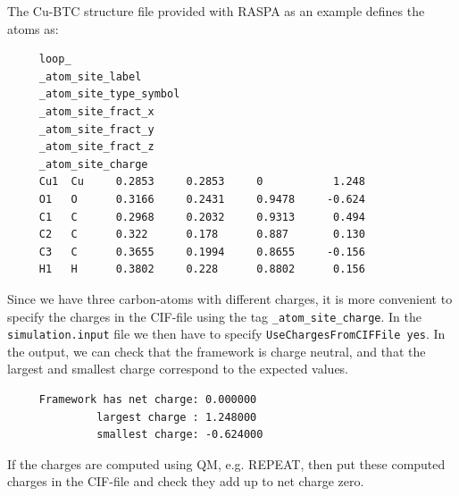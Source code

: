 The Cu-BTC structure file provided with RASPA as an example defines the atoms as:
\begin{tiny}
\begin{verbatim}
     loop_
     _atom_site_label
     _atom_site_type_symbol
     _atom_site_fract_x
     _atom_site_fract_y
     _atom_site_fract_z
     _atom_site_charge
     Cu1  Cu     0.2853     0.2853     0           1.248
     O1   O      0.3166     0.2431     0.9478     -0.624
     C1   C      0.2968     0.2032     0.9313      0.494
     C2   C      0.322      0.178      0.887       0.130
     C3   C      0.3655     0.1994     0.8655     -0.156
     H1   H      0.3802     0.228      0.8802      0.156
\end{verbatim}
\end{tiny}
Since we have three carbon-atoms with different charges, it is more convenient to specify the charges in the CIF-file using the tag \verb+_atom_site_charge+.
In the \verb+simulation.input+ file we then have to specify \verb+UseChargesFromCIFFile yes+.
In the output, we can check that the framework is charge neutral, and that the largest and smallest charge correspond to the expected values.
\begin{tiny}
\begin{verbatim}
     Framework has net charge: 0.000000
              largest charge : 1.248000
              smallest charge: -0.624000
\end{verbatim}
\end{tiny}
If the charges are computed using QM, e.g. REPEAT, then put these computed charges in the CIF-file and check they add up to net charge zero.

